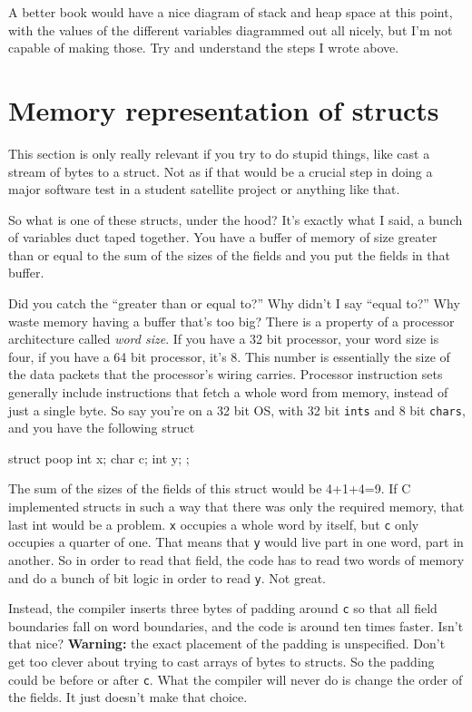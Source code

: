 \documentclass[ebook,11pt,oneside,openany]{memoir}
\newcommand{\cf}[1]{\texttt{#1}}
\begin{document}
A better book would have a nice diagram of stack and heap space at this point, with the values of the different variables diagrammed out all nicely, but I'm not capable of making those. Try and understand the steps I wrote above.

\section{Memory representation of structs}

This section is only really relevant if you try to do stupid things, like cast a stream of bytes to a struct. Not as if that would be a crucial step in doing a major software test in a student satellite project or anything like that.

So what is one of these structs, under the hood? It's exactly what I said, a bunch of variables duct taped together. You have a buffer of memory of size greater than or equal to the sum of the sizes of the fields and you put the fields in that buffer.

Did you catch the ``greater than or equal to?'' Why didn't I say ``equal to?'' Why waste memory having a buffer that's too big? There is a property of a processor architecture called \textit{word size}. If you have a 32 bit processor, your word size is four, if you have a 64 bit processor, it's 8. This number is essentially the size of the data packets that the processor's wiring carries. Processor instruction sets generally include instructions that fetch a whole word from memory, instead of just a single byte. So say you're on a 32 bit OS, with 32 bit \cf{ints} and 8 bit \cf{chars}, and you have the following struct

\begin{code}[language=C]
struct poop {
        int x;
        char c;
        int y;
};
\end{code}

The sum of the sizes of the fields of this struct would be 4+1+4=9. If C implemented structs in such a way that there was only the required memory, that last int would be a problem. \cf{x} occupies a whole word by itself, but \cf{c} only occupies a quarter of one. That means that \cf{y} would live part in one word, part in another. So in order to read that field, the code has to read two words of memory and do a bunch of bit logic in order to read \cf{y}. Not great.

Instead, the compiler inserts three bytes of padding around \cf{c} so that all field boundaries fall on word boundaries, and the code is around ten times faster. Isn't that nice? \textbf{Warning:} the exact placement of the padding is unspecified. Don't get too clever about trying to cast arrays of bytes to structs. So the padding could be before or after \cf{c}. What the compiler will never do is change the order of the fields. It just doesn't make that choice.
\end{document}
